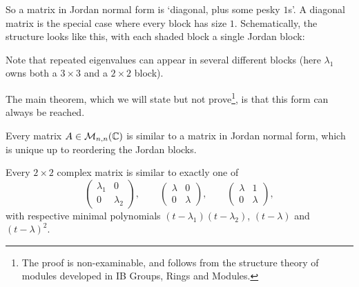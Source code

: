 \documentclass[a4paper]{scrartcl}
\begin{document}
So a matrix in Jordan normal form is `diagonal, plus some pesky $1$s'. A diagonal matrix is the special case where every block has size $1$. Schematically, the structure looks like this, with each shaded block a single Jordan block:
\begin{center}
\end{center}
Note that repeated eigenvalues can appear in several different blocks (here $\lambda_1$ owns both a $3 \times 3$ and a $2 \times 2$ block).

The main theorem, which we will state but not prove\footnote{The proof is non-examinable, and follows from the structure theory of modules developed in IB Groups, Rings and Modules.}, is that this form can always be reached.

\begin{theorem}
    Every matrix $A \in \mathcal{M}_{n,n}(\mathbb{C})$ is similar to a matrix in Jordan normal form, which is unique up to reordering the Jordan blocks.
\end{theorem}

\begin{example}
    Every $2 \times 2$ complex matrix is similar to exactly one of
    $$
    \begin{pmatrix}
        \lambda_1 & 0 \\ 0 & \lambda_2
    \end{pmatrix}, \qquad
    \begin{pmatrix}
        \lambda & 0 \\ 0 & \lambda
    \end{pmatrix}, \qquad
    \begin{pmatrix}
        \lambda & 1 \\ 0 & \lambda
    \end{pmatrix},
    $$
    with respective minimal polynomials $(t - \lambda_1)(t - \lambda_2)$, $(t - \lambda)$ and $(t - \lambda)^2$.
\end{example}
\end{document}

